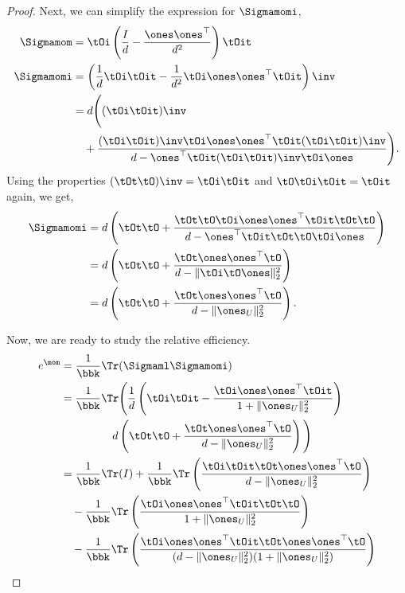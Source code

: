 \begin{proof}
Next, we can simplify the expression for $\Sigmamomi$,
\begin{align*}
    \Sigmamom &= 
      \tOi \left( \frac{I}{d} - \frac{\ones \ones^\top}{d^2} \right) \tOit \\
    \Sigmamomi &=
        \left(
        \frac{1}{d} 
          \tOi\tOit - \frac{1}{d^2} \tOi \ones \ones^\top \tOit
        \right)\inv \\
        &=
        d \Bigg(
          (\tOi\tOit)\inv \\
        &\quad
          + 
          \frac{
              (\tOi\tOit)\inv \tOi \ones \ones^\top \tOit (\tOi\tOit)\inv 
          }{
            d - \ones^\top \tOit (\tOi\tOit)\inv \tOi \ones 
          } \Bigg).
        \end{align*}
Using the properties $(\tOt\tO)\inv = \tOi\tOit$ and $\tO\tOi\tOit = \tOit$ again, we get,
        \begin{align*}
\Sigmamomi
          &=
        d \left(
          \tOt\tO + 
          \frac{
              \tOt\tO \tOi \ones \ones^\top \tOit \tOt\tO
          }{
            d - \ones^\top \tOit \tOt\tO \tOi \ones 
          } \right) \\
          &=
        d \left(
          \tOt\tO +
          \frac{
              \tOt \ones \ones^\top \tO
          }{
            d - \|\tOi \tO \ones\|_2^2 
          } \right) \\
          &=
        d \left(
          \tOt\tO +
          \frac{
              \tOt \ones \ones^\top \tO
          }{
            d - \|\ones_U\|_2^2 
          } \right).
\end{align*}

Now, we are ready to study the relative efficiency. 
\begin{align*}
  e^\mom &= \frac{1}{\bbk} \Tr(\Sigmaml \Sigmamomi) \\
    &= \frac{1}{\bbk}
    \Tr \Bigg( \frac{1}{d} \left(
      \tOi\tOit - \frac{\tOi \ones \ones^\top \tOit}
        {1+ \|\ones_U\|_2^2} 
        \right) \\
    &\quad \hphantom{\bbk \Tr}
        d
          \left(
          \tOt\tO +
          \frac{
              \tOt \ones \ones^\top \tO
          }{
            d - \|\ones_U\|_2^2 
          }
          \right)
          \Bigg) \\
    &= 
    \frac{1}{\bbk} \Tr(I) + \frac{1}{\bbk} \Tr\left(
          \frac{
              \tOi\tOit \tOt \ones \ones^\top \tO
          }{
            d - \|\ones_U\|_2^2 
          } \right) \\
    &\quad
    - \frac{1}{\bbk} \Tr\left(
      \frac{\tOi \ones \ones^\top \tOit \tOt\tO}{1+ \|\ones_U\|_2^2} 
      \right) \\
    &\quad
    - \frac{1}{\bbk} \Tr\left(
        \frac{\tOi \ones \ones^\top \tOit \tOt \ones \ones^\top \tO
}{(d - \|\ones_U\|_2^2 )(1+ \|\ones_U\|_2^2)} 
          \right) \\
\end{align*}


\end{proof}
